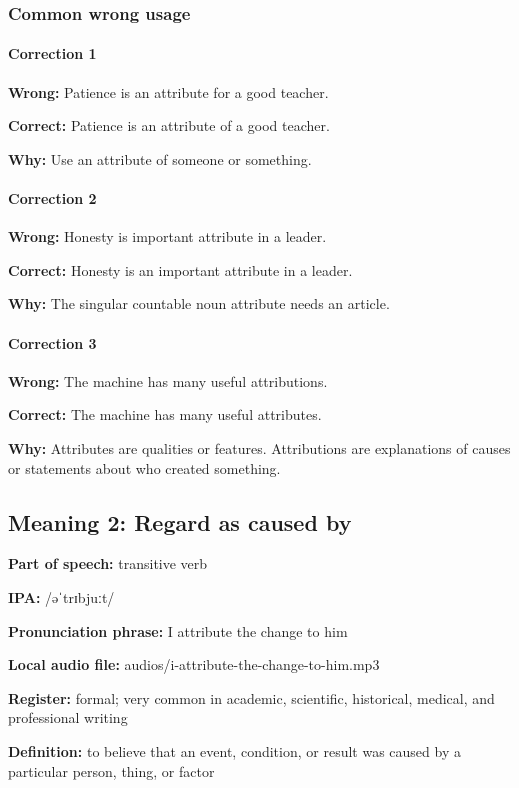 \documentclass[11pt]{article}
\begin{document}
\subsubsection{Common wrong usage}
\paragraph{Correction 1}
\textbf{Wrong:} Patience is an attribute for a good teacher.

\textbf{Correct:} Patience is an attribute of a good teacher.

\textbf{Why:} Use an attribute of someone or something.

\paragraph{Correction 2}
\textbf{Wrong:} Honesty is important attribute in a leader.

\textbf{Correct:} Honesty is an important attribute in a leader.

\textbf{Why:} The singular countable noun attribute needs an article.

\paragraph{Correction 3}
\textbf{Wrong:} The machine has many useful attributions.

\textbf{Correct:} The machine has many useful attributes.

\textbf{Why:} Attributes are qualities or features. Attributions are explanations of causes or statements about who created something.

\subsection{Meaning 2: Regard as caused by}
\textbf{Part of speech:} transitive verb

\textbf{IPA:} /əˈtrɪbjuːt/

\textbf{Pronunciation phrase:} I attribute the change to him

\textbf{Local audio file:} audios/i-attribute-the-change-to-him.mp3

\textbf{Register:} formal; very common in academic, scientific, historical, medical, and professional writing

\textbf{Definition:} to believe that an event, condition, or result was caused by a particular person, thing, or factor
\end{document}
